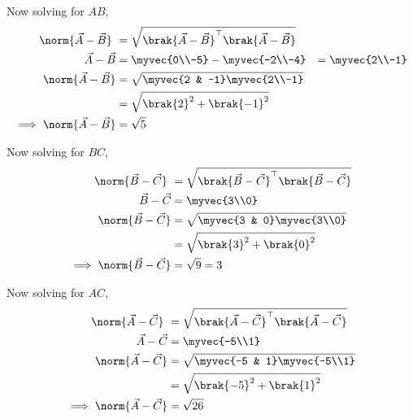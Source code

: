 \documentclass[11pt]{book}
\begin{document}
\begin{enumerate}[label=\thesection.\arabic*.,ref=\thesection.\theenumi]
Now solving for $AB$,\\
\begin{align}
\norm{\vec{A}-\vec{B}}\ &=  \sqrt{\brak{\vec{A}-\vec{B}}^{\top}\brak{\vec{A}-\vec{B}}} \\
	\vec{A}-\vec{B} &= \myvec{0\\-5} - \myvec{-2\\-4} &= \myvec{2\\-1}\\
\norm{\vec{A}-\vec{B}} &= \sqrt{\myvec{2 & -1}\myvec{2\\-1}}\\
&= \sqrt{\brak{2}^2 +\brak{-1}^2}\\
	\implies \norm{\vec{A}-\vec{B}} &=\sqrt{5}
\end{align}

Now solving for $BC$,\\
\begin{align}
	\norm{\vec{B}-\vec{C}}\ &=  \sqrt{\brak{\vec{B}-\vec{C}}^{\top}\brak{\vec{B}-\vec{C}}} \\
\vec{B}-\vec{C} &= \myvec{3\\0}\\
\norm{\vec{B}-\vec{C}} &= \sqrt{\myvec{3 & 0}\myvec{3\\0}}\\
&= \sqrt{\brak{3}^2+\brak{0}^2}\\
\implies \norm{\vec{B}-\vec{C}} &= \sqrt{9} = 3
\end{align}

Now solving for $AC$,\\
\begin{align}
	\norm{\vec{A}-\vec{C}}\ &=  \sqrt{\brak{\vec{A}-\vec{C}}^{\top}\brak{\vec{A}-\vec{C}}} \\
\vec{A}-\vec{C} &= \myvec{-5\\1}\\
\norm{\vec{A}-\vec{C}} &= \sqrt{\myvec{-5 & 1}\myvec{-5\\1}}\\
&= \sqrt{\brak{-5}^2+\brak{1}^2}\\
\implies \norm{\vec{A}-\vec{C}}&=\sqrt{26}
\end{align}


\end{enumerate}
\end{document}
